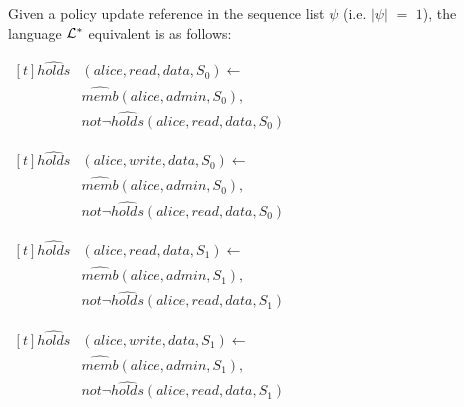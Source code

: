\documentclass[11pt, twocolumn]{article}
\newenvironment{vquote}
  {\begin{list}{}{\leftmargin 1em}\item[]}
  {\end{list}}
\begin{document}
          Given a policy update reference in the sequence list $\psi$ (i.e.
          $|\psi|$ $=$ $1$), the language ${\cal L}^{*}$ equivalent is as
          follows:

          \begin{vquote}
            \begin{math}
              \begin{aligned}[t]
                \hat{holds}&(alice, read, data, S_{0}) \leftarrow \\
                 & \hat{memb}(alice, admin, S_{0}), \\
                 & not \lnot \hat{holds}(alice, read, data, S_{0})
              \end{aligned}
            \end{math}

            \begin{math}
              \begin{aligned}[t]
                \hat{holds}&(alice, write, data, S_{0}) \leftarrow \\
                 & \hat{memb}(alice, admin, S_{0}), \\
                 & not \lnot \hat{holds}(alice, read, data, S_{0})
              \end{aligned}
            \end{math}

            \begin{math}
              \begin{aligned}[t]
                \hat{holds}&(alice, read, data, S_{1}) \leftarrow \\
                 & \hat{memb}(alice, admin, S_{1}), \\
                 & not \lnot \hat{holds}(alice, read, data, S_{1})
              \end{aligned}
            \end{math}

            \begin{math}
              \begin{aligned}[t]
                \hat{holds}&(alice, write, data, S_{1}) \leftarrow \\
                 & \hat{memb}(alice, admin, S_{1}), \\
                 & not \lnot \hat{holds}(alice, read, data, S_{1})
              \end{aligned}
            \end{math}
          \end{vquote}
\end{document}
